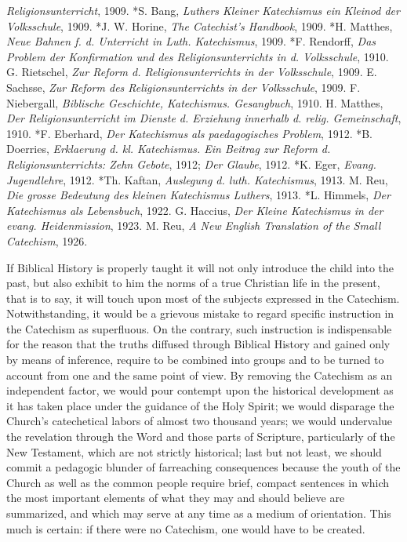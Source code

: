 \emph{Religionsunterricht}, 1909. *S. Bang, \emph{Luthers Kleiner Katechismus ein Kleinod der Volksschule}, 1909. *J. W. Horine, \emph{The Catechist’s Handbook}, 1909. *H. Matthes, \emph{Neue Bahnen f. d. Unterricht in Luth. Katechismus}, 1909. *F. Rendorff, \emph{Das Problem der Konfirmation und des Religionsunterrichts in d. Volksschule}, 1910. G. Rietschel, \emph{Zur Reform d. Religionsunterrichts in der Volksschule}, 1909. E. Sachsse, \emph{Zur Reform des Religionsunterrichts in der Volksschule}, 1909. F. Niebergall, \emph{Biblische Geschichte, Katechismus. Gesangbuch}, 1910. H. Matthes, \emph{Der Religionsunterricht im Dienste d. Erziehung innerhalb d. relig. Gemeinschaft}, 1910. *F. Eberhard, \emph{Der Katechismus als paedagogisches Problem}, 1912. *B. Doerries, \emph{Erklaerung d. kl. Katechismus. Ein Beitrag zur Reform d. Religionsunterrichts: Zehn Gebote}, 1912; \emph{Der Glaube}, 1912. *K. Eger, \emph{Evang. Jugendlehre}, 1912. *Th. Kaftan, \emph{Auslegung d. luth. Katechismus}, 1913. M. Reu, \emph{Die grosse Bedeutung des kleinen Katechismus Luthers}, 1913. *L. Himmels, \emph{Der Katechismus als Lebensbuch}, 1922. G. Haccius, \emph{Der Kleine Katechismus in der evang. Heidenmission}, 1923. M. Reu, \emph{A New English Translation of the Small Catechism}, 1926.

If Biblical History is properly taught it will not only introduce the child into the past, but also exhibit to him the norms of a true Christian life in the present, that is to say, it will touch upon most of the subjects expressed in the Catechism. Notwithstanding, it would be a grievous mistake to regard specific instruction in the Catechism as superfluous. On the contrary, such instruction is indispensable for the reason that the truths diffused through Biblical History and gained only by means of inference, require to be combined into groups and to be turned to account from one and the same point of view. By removing the Catechism as an independent factor, we would pour contempt upon the historical development as it has taken place under the guidance of the Holy Spirit; we would disparage the Church’s catechetical labors of almost two thousand years; we would undervalue the revelation through the Word and those parts of Scripture, particularly of the New Testament, which are not strictly historical; last but not least, we should commit a pedagogic blunder of farreaching consequences because the youth of the Church as well as the
common people require brief, compact sentences in which the most important elements of what they may and should believe are summarized, and which may serve at any time as a medium of orientation. This much is certain: if there were no Catechism, one would have to be created.

